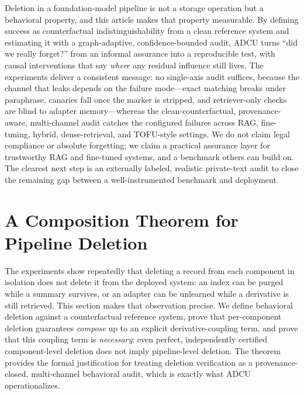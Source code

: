\documentclass[10pt,journal,compsoc]{IEEEtran}
\newcommand{\method}{ADCU}
\begin{document}
Deletion in a foundation-model pipeline is not a storage operation but a behavioral property, and this article makes that property measurable. By defining success as counterfactual indistinguishability from a clean reference system and estimating it with a graph-adaptive, confidence-bounded audit, \method{} turns ``did we really forget?'' from an informal assurance into a reproducible test, with causal interventions that say \emph{where} any residual influence still lives. The experiments deliver a consistent message: no single-axis audit suffices, because the channel that leaks depends on the failure mode---exact matching breaks under paraphrase, canaries fall once the marker is stripped, and retriever-only checks are blind to adapter memory---whereas the clean-counterfactual, provenance-aware, multi-channel audit catches the configured failures across RAG, fine-tuning, hybrid, dense-retrieval, and TOFU-style settings. We do not claim legal compliance or absolute forgetting; we claim a practical assurance layer for trustworthy RAG and fine-tuned systems, and a benchmark others can build on. The clearest next step is an externally labeled, realistic private-text audit to close the remaining gap between a well-instrumented benchmark and deployment.




\clearpage
\appendices

\section{A Composition Theorem for Pipeline Deletion}
\label{sec:composition}

The experiments show repeatedly that deleting a record from each
component in isolation does not delete it from the deployed system: an
index can be purged while a summary survives, or an adapter can be
unlearned while a derivative is still retrieved. This section
makes that observation precise. We define behavioral deletion against a
counterfactual reference system, prove that per-component deletion
guarantees \emph{compose} up to an explicit derivative-coupling term,
and prove that this coupling term is \emph{necessary}: even perfect,
independently certified component-level deletion does not imply
pipeline-level deletion. The theorem provides the formal justification
for treating deletion verification as a provenance-closed, multi-channel
behavioral audit, which is exactly what \method{} operationalizes.
\end{document}
